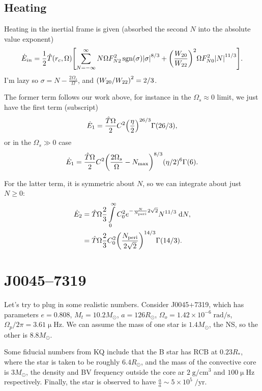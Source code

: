 \documentclass[11pt,
        usenames, %
        dvipsnames %
    ]{article}
\newcommand*{\scinot}[2]{#1\times10^{#2}}
\DeclareMathOperator{\sgn}{sgn}
\DeclarePairedDelimiter\abs{\lvert}{\rvert}
\DeclarePairedDelimiter\p{\lparen}{\rparen}
\DeclarePairedDelimiter\s{\lbrack}{\rbrack}
\begin{document}
\subsection{Heating}

Heating in the inertial frame is given (absorbed the second $N$ into the
absolute value exponent)
\begin{align}
     \dot{E}_{in} = \frac{1}{2}\hat{T}\p*{r_c, \Omega}\s*{
         \sum\limits_{N = -\infty}^\infty
            N\Omega F_{N2}^2 \sgn \p*{\sigma} \abs*{\sigma}^{8/3}
            + \p*{\frac{W_{20}}{W_{22}}}^2\Omega F_{N0}^2 \abs*{N}^{11/3}}.
\end{align}
I'm lazy so $\sigma = N - \frac{2\Omega_s}{\Omega}$, and $\p*{W_{20} /
W_{22}}^2 = 2/3$.

The former term follows our work above, for instance in the $\Omega_s \approx 0$
limit, we just have the first term (subscript)
\begin{equation}
    \dot{E}_1 = \frac{\hat{T}\Omega }{2} C^2
        \p*{\frac{\eta}{2}}^{26/3}\Gamma\p*{26/3},
\end{equation}
or in the $\Omega_s \gg 0$ case
\begin{equation}
    \dot{E}_1 = \frac{\hat{T}\Omega}{2} C^2
        \p*{\frac{2\Omega_s}{\Omega} - N_{\max}}^{8/3}
            (\eta/2)^{6} \Gamma\p*{6}.
\end{equation}

For the latter term, it is symmetric about $N$, so we can integrate about just
$N \geq 0$:
\begin{align}
    \dot{E}_2 &= \hat{T}\Omega \frac{2}{3} \int\limits_0^\infty
            C_0^2 e^{-\frac{N}{N_{\rm peri}}2\sqrt{2}}N^{11/3}\;\mathrm{d}N,\\
        &= \hat{T} \Omega \frac{2}{3} C_0^2
            \p*{\frac{N_{\rm peri}}{2\sqrt{2}}}^{14/3}
            \Gamma\p*{14/3}.
\end{align}

\section{J0045--7319}

Let's try to plug in some realistic numbers. Consider J0045+7319, which has
parameters $e = 0.808$, $M_t = 10.2M_{\odot}$, $a = 126R_{\odot}$, $\Omega_o =
\scinot{1.42}{-6}\;\mathrm{rad/s}$, $\Omega_p/2\pi = 3.61\upmu\mathrm{Hz}$. We
can assume the mass of one star is $1.4M_{\odot}$, the NS, so the other is
$8.8M_{\odot}$.

Some fiducial numbers from KQ include that the B star has RCB at $0.23R_*$,
where the star is taken to be roughly $6.4R_{\odot}$, and the mass of the
convective core is $3M_{\odot}$, the density and BV frequency outside the core
ar $2\;\mathrm{g/cm^3}$ and $100\upmu\mathrm{Hz}$ respectively. Finally, the
star is observed to have $\frac{\dot{a}}{a} \sim \scinot{5}{5}\;\mathrm{/yr}$.
\end{document}
